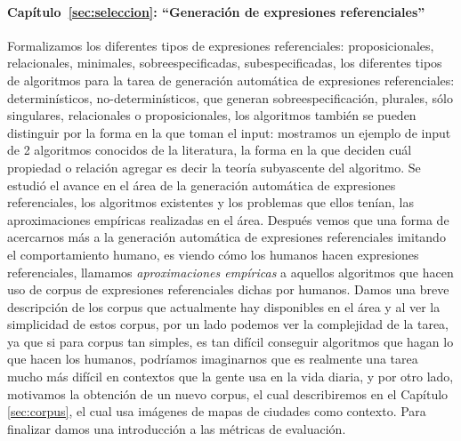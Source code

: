 \paragraph{Cap\'itulo~\ref{sec:seleccion}: ``Generaci\'on de expresiones referenciales''} Formalizamos los diferentes tipos de expresiones referenciales: proposicionales, relacionales, minimales, sobreespecificadas, subespecificadas, los diferentes tipos de algoritmos para la tarea de generaci\'on autom\'atica de expresiones referenciales: determin\'isticos, no-determin\'isticos, que generan sobreespecificaci\'on, 
plurales, s\'olo singulares, relacionales o proposicionales, los algoritmos tambi\'en se pueden distinguir por la forma en la que toman el 
input: mostramos un ejemplo de input de 2 algoritmos conocidos de la literatura, la forma en la que deciden cu\'al propiedad o relaci\'on 
agregar es decir la teor\'ia subyascente del algoritmo. Se estudi\'o el avance en el \'area de la generaci\'on autom\'atica de expresiones referenciales, los algoritmos existentes y los problemas que ellos ten\'ian, las aproximaciones emp\'iricas realizadas en el \'area.
Despu\'es vemos que una forma de acercarnos m\'as a la generaci\'on autom\'atica de expresiones referenciales  imitando el comportamiento humano, es viendo c\'omo los humanos hacen expresiones referenciales, llamamos {\it aproximaciones emp\'iricas} a aquellos algoritmos que hacen uso de corpus de expresiones referenciales dichas por humanos. Damos una breve descripci\'on de los corpus que actualmente hay disponibles en el \'area y al ver la simplicidad de estos corpus, por un lado podemos ver la complejidad de la tarea, ya que si para corpus tan simples, es tan dif\'icil conseguir algoritmos que hagan lo que hacen los humanos, podr\'iamos imaginarnos que es realmente una tarea mucho m\'as dif\'icil en contextos que la gente usa en la vida diaria, y por otro lado, motivamos la obtenci\'on de un nuevo  corpus, el cual describiremos en el Cap\'itulo \ref{sec:corpus}, el cual usa im\'agenes de mapas de ciudades como contexto. Para finalizar damos una introducci\'on a las m\'etricas de evaluaci\'on. 



